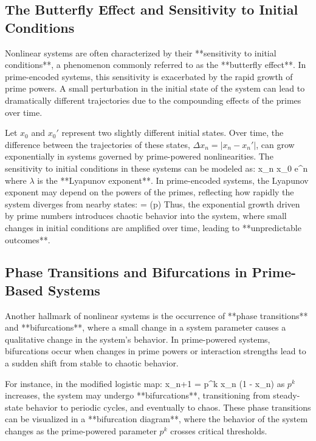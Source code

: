 \documentclass[12pt]{article}
\begin{document}
\subsection{The Butterfly Effect and Sensitivity to Initial Conditions}

Nonlinear systems are often characterized by their **sensitivity to initial conditions**, a phenomenon commonly referred to as the **butterfly effect**. In prime-encoded systems, this sensitivity is exacerbated by the rapid growth of prime powers. A small perturbation in the initial state of the system can lead to dramatically different trajectories due to the compounding effects of the primes over time.

Let \( x_0 \) and \( x_0' \) represent two slightly different initial states. Over time, the difference between the trajectories of these states, \( \Delta x_n = |x_n - x_n'| \), can grow exponentially in systems governed by prime-powered nonlinearities. The sensitivity to initial conditions in these systems can be modeled as:
\]
\Delta x_n \approx \Delta x_0 e^{\lambda n}
\]
where \( \lambda \) is the **Lyapunov exponent**. In prime-encoded systems, the Lyapunov exponent may depend on the powers of the primes, reflecting how rapidly the system diverges from nearby states:
\]
\lambda = \log(p)
\]
Thus, the exponential growth driven by prime numbers introduces chaotic behavior into the system, where small changes in initial conditions are amplified over time, leading to **unpredictable outcomes**.

\subsection{Phase Transitions and Bifurcations in Prime-Based Systems}

Another hallmark of nonlinear systems is the occurrence of **phase transitions** and **bifurcations**, where a small change in a system parameter causes a qualitative change in the system’s behavior. In prime-powered systems, bifurcations occur when changes in prime powers or interaction strengths lead to a sudden shift from stable to chaotic behavior.

For instance, in the modified logistic map:
\]
x_{n+1} = p^k x_n (1 - x_n)
\]
as \( p^k \) increases, the system may undergo **bifurcations**, transitioning from steady-state behavior to periodic cycles, and eventually to chaos. These phase transitions can be visualized in a **bifurcation diagram**, where the behavior of the system changes as the prime-powered parameter \( p^k \) crosses critical thresholds.
\end{document}
